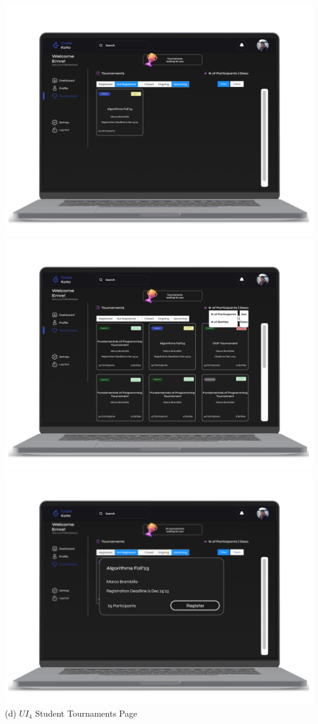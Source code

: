 \begin{center}
    \includegraphics[scale=0.13]{Images/ui-ux/student_tournaments_2.png}    \includegraphics[scale=0.13]{Images/ui-ux/student_tournaments_3.png}    \includegraphics[scale=0.13]{Images/ui-ux/student_tournaments_4.png}
        (d) $UI_{4}$ Student Tournaments Page
\end{center}

